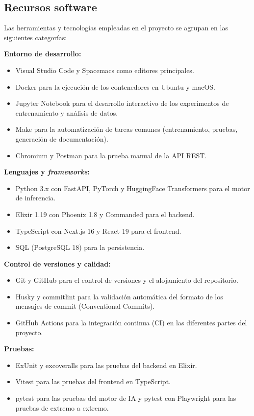 \subsection{Recursos software}

Las herramientas y tecnologías empleadas en el proyecto se agrupan en las siguientes categorías:

\textbf{Entorno de desarrollo:}
\begin{itemize}[noitemsep]
 \item Visual Studio Code y Spacemacs como editores principales.
 \item Docker para la ejecución de los contenedores en Ubuntu y macOS.
 \item Jupyter Notebook para el desarrollo interactivo de los experimentos de entrenamiento y análisis de datos.
 \item Make para la automatización de tareas comunes (entrenamiento, pruebas, generación de documentación).
 \item Chromium y Postman para la prueba manual de la API REST.
\end{itemize}

\textbf{Lenguajes y \emph{frameworks}:}
\begin{itemize}[noitemsep]
 \item Python 3.x con FastAPI, PyTorch y HuggingFace Transformers para el motor de inferencia.
 \item Elixir 1.19 con Phoenix 1.8 y Commanded para el backend.
 \item TypeScript con Next.js 16 y React 19 para el frontend.
 \item SQL (PostgreSQL 18) para la persistencia.
\end{itemize}

\textbf{Control de versiones y calidad:}
\begin{itemize}[noitemsep]
 \item Git y GitHub para el control de versiones y el alojamiento del repositorio.
 \item Husky y commitlint para la validación automática del formato de los mensajes de commit (Conventional Commits).
 \item GitHub Actions para la integración continua (CI) en las diferentes partes del proyecto.
\end{itemize}

\textbf{Pruebas:}
\begin{itemize}[noitemsep]
 \item ExUnit y excoveralls para las pruebas del backend en Elixir.
 \item Vitest para las pruebas del frontend en TypeScript.
 \item pytest para las pruebas del motor de IA y pytest con Playwright para las pruebas de extremo a extremo.
\end{itemize}

